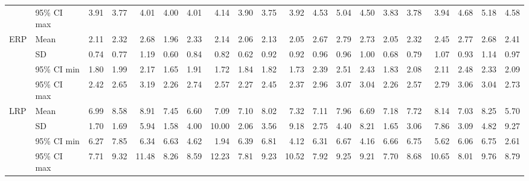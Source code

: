 \begin{longtable}{llrrrrrrrrrrrrrrrrrr}
    & 95\% CI max &       3.91 &       3.77 &       4.01 &       4.00 &       4.01 &       4.14 &       3.90 &       3.75 &       3.92 &       4.53 &       5.04 &       4.50 &       3.83 &       3.78 &       3.94 &       4.68 &       5.18 &       4.58 \\
\cline{1-20}
\multirow{4}{*}{ERP} & Mean &       2.11 &       2.32 &       2.68 &       1.96 &       2.33 &       2.14 &       2.06 &       2.13 &       2.05 &       2.67 &       2.79 &       2.73 &       2.05 &       2.32 &       2.45 &       2.77 &       2.68 &       2.41 \\
    & SD &       0.74 &       0.77 &       1.19 &       0.60 &       0.84 &       0.82 &       0.62 &       0.92 &       0.92 &       0.96 &       0.96 &       1.00 &       0.68 &       0.79 &       1.07 &       0.93 &       1.14 &       0.97 \\
    & 95\% CI min &       1.80 &       1.99 &       2.17 &       1.65 &       1.91 &       1.72 &       1.84 &       1.82 &       1.73 &       2.39 &       2.51 &       2.43 &       1.83 &       2.08 &       2.11 &       2.48 &       2.33 &       2.09 \\
    & 95\% CI max &       2.42 &       2.65 &       3.19 &       2.26 &       2.74 &       2.57 &       2.27 &       2.45 &       2.37 &       2.96 &       3.07 &       3.04 &       2.26 &       2.57 &       2.79 &       3.06 &       3.04 &       2.73 \\
\cline{1-20}
\multirow{4}{*}{LRP} & Mean &       6.99 &       8.58 &       8.91 &       7.45 &       6.60 &       7.09 &       7.10 &       8.02 &       7.32 &       7.11 &       7.96 &       6.69 &       7.18 &       7.72 &       8.14 &       7.03 &       8.25 &       5.70 \\
    & SD &       1.70 &       1.69 &       5.94 &       1.58 &       4.00 &      10.00 &       2.06 &       3.56 &       9.18 &       2.75 &       4.40 &       8.21 &       1.65 &       3.06 &       7.86 &       3.09 &       4.82 &       9.27 \\
    & 95\% CI min &       6.27 &       7.85 &       6.34 &       6.63 &       4.62 &       1.94 &       6.39 &       6.81 &       4.12 &       6.31 &       6.67 &       4.16 &       6.66 &       6.75 &       5.62 &       6.06 &       6.75 &       2.61 \\
    & 95\% CI max &       7.71 &       9.32 &      11.48 &       8.26 &       8.59 &      12.23 &       7.81 &       9.23 &      10.52 &       7.92 &       9.25 &       9.21 &       7.70 &       8.68 &      10.65 &       8.01 &       9.76 &       8.79 \\
\end{longtable}
